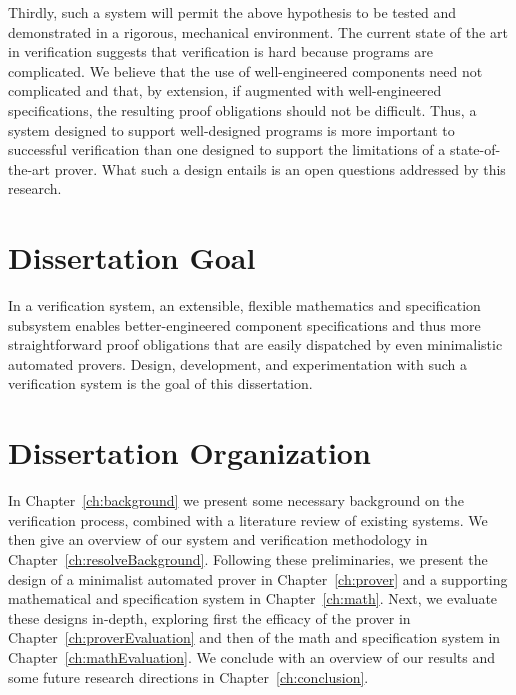 Thirdly, such a system will permit the above hypothesis to be tested and demonstrated in a rigorous, mechanical environment.  The current state of the art in verification suggests that verification is hard because programs are complicated.  We believe that the use of well-engineered components need not complicated and that, by extension, if augmented with well-engineered specifications, the resulting proof obligations should not be difficult.  Thus, a system designed to support well-designed programs is more important to successful verification than one designed to support the limitations of a state-of-the-art prover.  What such a design entails is an open questions addressed by this research.

\section{Dissertation Goal}
In a verification system, an extensible, flexible mathematics and specification subsystem enables better-engineered component specifications and thus more straightforward proof obligations that are easily dispatched by even minimalistic automated provers.  Design, development, and experimentation with such a verification system is the goal of this dissertation.  

\section{Dissertation Organization}
In Chapter~\ref{ch:background} we present some necessary background on the verification process, combined with a literature review of existing systems.  We then give an overview of our system and verification methodology in Chapter~\ref{ch:resolveBackground}.  Following these preliminaries, we present the design of a minimalist automated prover in Chapter~\ref{ch:prover} and a supporting mathematical and specification system in Chapter~\ref{ch:math}.  Next, we evaluate these designs in-depth, exploring first the efficacy of the prover in Chapter~\ref{ch:proverEvaluation} and then of the math and specification system in Chapter~\ref{ch:mathEvaluation}.  We conclude with an overview of our results and some future research directions in Chapter~\ref{ch:conclusion}.
